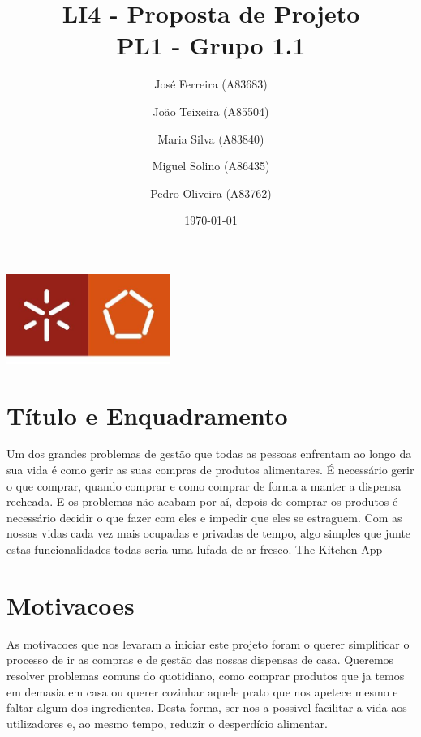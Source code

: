 \documentclass[a4paper]{report}
\begin{document}
\title{LI4 - Proposta de Projeto\\ 
\large PL1 - Grupo 1.1}
\author{José Ferreira (A83683) \and João Teixeira (A85504) \and Maria Silva
(A83840) \and Miguel Solino (A86435) \and Pedro Oliveira (A83762)}
\date{\today}

\begin{center}
    \begin{minipage}{0.75\linewidth}
        \centering
        \includegraphics[width=0.4\textwidth]{images/eng.jpeg}\par\vspace{1cm}
        \vspace{1.5cm}
        \href{https://www.uminho.pt/PT}
        {\color{black}{\scshape\LARGE Universidade do Minho}} \par
        \vspace{1cm}
        \href{https://www.di.uminho.pt/}
        {\color{black}{\scshape\Large Departamento de Informática}} \par
        \vspace{1.5cm}
        \maketitle
    \end{minipage}
\end{center}

\pagebreak
\section{Título e Enquadramento}
Um dos grandes problemas de gestão que todas as pessoas enfrentam ao longo da
sua vida é como gerir as suas compras de produtos alimentares. É necessário
gerir o que comprar, quando comprar e como comprar de forma a manter a dispensa
recheada. E os problemas não acabam por aí, depois de comprar os produtos é
necessário decidir o que fazer com eles e impedir que eles se estraguem. Com as
nossas vidas cada vez mais ocupadas e privadas de tempo, algo simples que junte
estas funcionalidades todas seria uma lufada de ar fresco.
The Kitchen App

\section{Motivacoes}
As motivacoes que nos levaram a iniciar este projeto foram o querer simplificar
o processo de ir as compras e de gestão das nossas dispensas de casa.
Queremos resolver problemas comuns do quotidiano, como comprar produtos que 
ja temos em demasia em casa ou querer cozinhar aquele prato
que nos apetece mesmo e faltar algum dos ingredientes. 
Desta forma, ser-nos-a possivel facilitar a vida aos utilizadores e, 
ao mesmo tempo, reduzir o desperdício alimentar.
\end{document}

